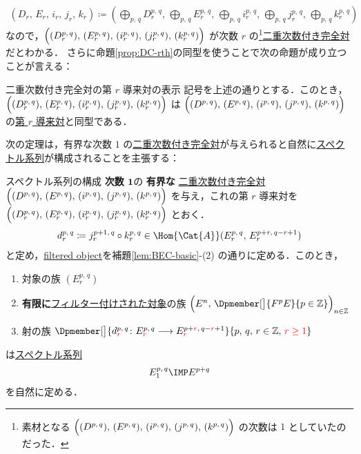 \documentclass[algtopo_main]{subfiles}
\begin{document}
\begin{align}
    (D_r,\,E_r,\, i_r,\, j_r,\, k_r) \coloneqq \left( \bigoplus_{p,\, q} D_r^{p,\, q},\, \bigoplus_{p,\, q} E_r^{p,\, q},\, \bigoplus_{p,\, q} i_r^{p,\, q},\, \bigoplus_{p,\, q} j_r^{p,\, q},\, \bigoplus_{p,\, q} k_r^{p,\, q} \right) 
\end{align}
なので，$\Bigl( (D_r^{p,\, q}),\, (E_r^{p,\, q}),\, (i_r^{p,\, q}),\, (j_r^{p,\, q}),\, (k_r^{p,\, q}) \Bigr)$ が次数 $r$ の\footnote{素材となる $\Bigl( (D^{p,\, q}),\, (E^{p,\, q}),\, (i^{p,\, q}),\, (j^{p,\, q}),\, (k^{p,\, q}) \Bigr)$ の次数は $1$ としていたのだった．}\hyperref[def:BEC]{二重次数付き完全対}だとわかる．
さらに命題\ref{prop:DC-rth}の同型を使うことで次の命題が成り立つことが言える：

\begin{myprop}[label=prop:DC-BEC-rth]{二重次数付き完全対の第 $r$ 導来対の表示}
    記号を上述の通りとする．このとき，$\Bigl( (D_r^{p,\, q}),\, (E_r^{p,\, q}),\, (i_r^{p,\, q}),\, (j_r^{p,\, q}),\, (k_r^{p,\, q}) \Bigr)$ は  $\Bigl( (D^{p,\, q}),\, (E^{p,\, q}),\, (i^{p,\, q}),\, (j^{p,\, q}),\, (k^{p,\, q}) \Bigr)$ の\hyperref[def:DC-BEC]{第 $r$ 導来対}と同型である．
\end{myprop}


次の定理は，有界な次数 $1$ の\hyperref[def:BEC]{二重次数付き完全対}が与えられると自然に\hyperref[def:SSQ]{スペクトル系列}が構成されることを主張する：

\begin{mytheo}[label=thm:SSQ-basic]{スペクトル系列の構成}
    \textbf{次数 $\bm{1}$}の \textbf{有界な} \hyperref[def:BEC]{二重次数付き完全対} $\Bigl( (D^{p,\, q}),\, (E^{p,\, q}),\, (i^{p,\, q}),\, (j^{p,\, q}),\, (k^{p,\, q}) \Bigr)$ を与え，これの第 $r$ 導来対を $\Bigl( (D_r^{p,\, q}),\, (E_r^{p,\, q}),\, (i_r^{p,\, q}),\, (j_r^{p,\, q}),\, (k_r^{p,\, q}) \Bigr)$ とおく．
    \begin{align}
        d_r^{p,\, q} \coloneqq j_r^{p+1,\, q} \circ k_r^{p,\, q} \in \Hom{\Cat{A}} (E_r^{p,\, q} ,\, E_{r}^{p+r,\, q-r+1})
    \end{align}
    と定め，\hyperref[def:filtration]{filtered object}を補題\ref{lem:BEC-basic}-(2) の通りに定める．このとき，
    \begin{enumerate}
        \item 対象の族 $(E_r^{p,\, q})$
        \item \textbf{有限に}\hyperref[def:filtration]{フィルター付けされた対象}の族 $\Bigl(E^n,\, \Dpmember[\big]{F^{p}E}{p\in \mathbb{Z}} \Bigr)_{n \in \mathbb{Z}}$
        \item 射の族 $\Dpmember[\big]{d_{\textcolor{red}{r}}^{p,\, q} \colon E^{p,\, q}_{\textcolor{red}{r}} \lto E^{p + \textcolor{red}{r},\, q-\textcolor{red}{r}+1}_{\textcolor{red}{r}}}{p,\, q,\, r \in \mathbb{Z},\, \textcolor{red}{r \ge 1}}$
    \end{enumerate}
    は\hyperref[def:SSQ]{スペクトル系列}
    \begin{align}
        E_1^{p,\, q} \IMP E^{p+q}
    \end{align}
    を自然に定める．
\end{mytheo}
\end{document}
